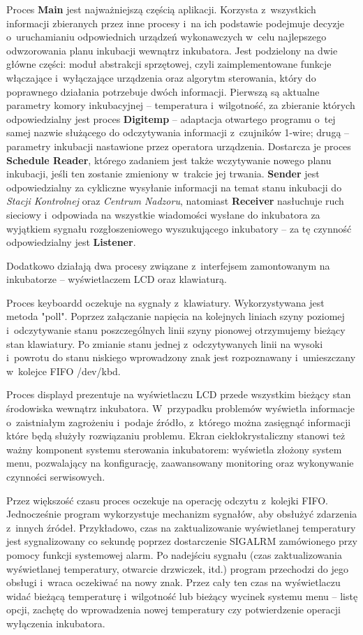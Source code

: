 Proces \textbf{Main} jest najważniejszą częścią aplikacji. Korzysta
z~wszystkich informacji zbieranych przez inne procesy i~na ich podstawie podejmuje
decyzje o~uruchamianiu odpowiednich urządzeń wykonawczych w~celu najlepszego
odwzorowania planu inkubacji wewnątrz inkubatora. Jest podzielony na dwie główne
części: moduł abstrakcji sprzętowej, czyli zaimplementowane funkcje włączające
i~wyłączające urządzenia oraz algorytm sterowania, który do poprawnego działania
potrzebuje dwóch informacji. Pierwszą są aktualne parametry komory inkubacyjnej
-- temperatura i~wilgotność, za zbieranie których odpowiedzialny jest proces
\textbf{Digitemp} -- adaptacja otwartego programu o~tej samej nazwie służącego
do odczytywania informacji z~czujników 1-wire; drugą -- parametry inkubacji
nastawione przez operatora urządzenia. Dostarcza je proces \textbf{Schedule
Reader}, którego zadaniem jest także wczytywanie nowego planu inkubacji, jeśli ten
zostanie zmieniony w~trakcie jej trwania. \textbf{Sender} jest odpowiedzialny za
cykliczne wysyłanie informacji na temat stanu inkubacji do \emph{Stacji
Kontrolnej} oraz \emph{Centrum Nadzoru}, natomiast \textbf{Receiver} nasłuchuje
ruch sieciowy i~odpowiada na wszystkie wiadomości wysłane do inkubatora za
wyjątkiem sygnału rozgłoszeniowego wyszukującego inkubatory -- za tę czynność
odpowiedzialny jest \textbf{Listener}.

Dodatkowo działają dwa procesy związane z~interfejsem zamontowanym na
inkubatorze -- wyświetlaczem LCD oraz klawiaturą. 

Proces keyboardd oczekuje na sygnały z~klawiatury. Wykorzystywana jest metoda
"poll". Poprzez załączanie napięcia na kolejnych liniach szyny poziomej
i~odczytywanie stanu poszczególnych linii szyny pionowej otrzymujemy bieżący stan
klawiatury. Po zmianie stanu jednej z~odczytywanych linii na wysoki i~powrotu do
stanu niskiego wprowadzony znak jest rozpoznawany i~umieszczany w~kolejce FIFO
/dev/kbd.

Proces displayd prezentuje na wyświetlaczu LCD przede wszystkim bieżący stan
środowiska wewnątrz inkubatora. W~przypadku problemów wyświetla informacje
o~zaistniałym zagrożeniu i~podaje źródło, z~którego można zasięgnąć informacji
które będą służyły rozwiązaniu problemu. Ekran ciekłokrystaliczny stanowi też ważny
komponent systemu sterowania inkubatorem: wyświetla złożony system menu,
pozwalający na konfigurację, zaawansowany monitoring oraz wykonywanie
czynności serwisowych.

Przez większość czasu proces oczekuje na operację odczytu z~kolejki FIFO.
Jednocześnie program wykorzystuje mechanizm sygnałów, aby obsłużyć zdarzenia z~innych
źródeł. Przykładowo, czas na zaktualizowanie wyświetlanej temperatury jest
sygnalizowany co sekundę poprzez dostarczenie SIGALRM zamówionego przy pomocy
funkcji systemowej alarm. Po nadejściu sygnału (czas zaktualizowania
wyświetlanej temperatury, otwarcie drzwiczek, itd.) program przechodzi do jego
obsługi i~wraca oczekiwać na nowy znak. Przez cały ten czas na wyświetlaczu
widać bieżącą temperaturę i~wilgotność lub bieżący wycinek systemu menu -- listę
opcji, zachętę do wprowadzenia nowej temperatury czy potwierdzenie operacji
wyłączenia inkubatora.


